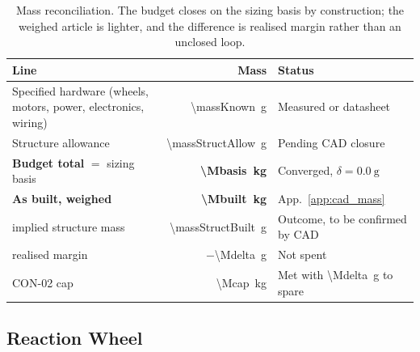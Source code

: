 \begin{table}[htbp]
\centering
\caption[Mass reconciliation]{Mass reconciliation. The budget closes on the
sizing basis by construction; the weighed article is lighter, and the
difference is realised margin rather than an unclosed loop.}
\label{tab:spec_mass_rollup}
\small
\begin{tabular}{@{} L{7.2cm} r l @{}}
\toprule
Line & Mass & Status \\
\midrule
Specified hardware (wheels, motors, power, electronics, wiring) & \qty{\massKnown}{\gram} & Measured or datasheet \\
Structure allowance                          & \qty{\massStructAllow}{\gram} & Pending CAD closure \\
\midrule
\textbf{Budget total} $=$ sizing basis        & \textbf{\qty{\Mbasis}{\kilo\gram}} & Converged, $\delta=\qty{0.0}{\gram}$ \\
\textbf{As built, weighed}                    & \textbf{\qty{\Mbuilt}{\kilo\gram}} & App.~\ref{app:cad_mass} \\
\quad implied structure mass                  & \qty{\massStructBuilt}{\gram} & Outcome, to be confirmed by CAD \\
\quad realised margin                         & $-$\qty{\Mdelta}{\gram} & Not spent \\
\midrule
CON-02 cap                                    & \qty{\Mcap}{\kilo\gram} & Met with \qty{\Mdelta}{\gram} to spare \\
\bottomrule
\end{tabular}
\end{table}

\subsection{Reaction Wheel}
\label{app:specs_wheel}

